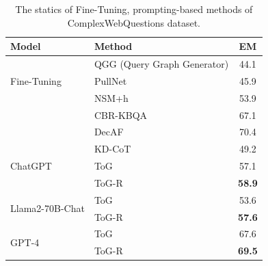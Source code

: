 \documentclass{article} %
\begin{document}
\begin{table}[]
\centering
\begin{tabular}{llc}
\hline
       \textbf{Model}    & \textbf{Method} &  \textbf{EM} \\ \hline
\multirow{3}{*}{Fine-Tuning}     
 &  QGG (Query Graph Generator) \citep{lan2020query}                    &  44.1 	   \\
 &   PullNet \citep{sun2019pullnet}                    & 45.9  \\
 &  NSM+h	 \citep{NSM}                       & 53.9	 \\
                              &  CBR-KBQA \citep{cwq1}	& 67.1	\\     
                                 &  	DecAF 	 
 \citep{webqsp1}                    & 70.4		 \\


                                
                                 \hline
\multirow{3}{*}{ChatGPT}          
                                 &  KD-CoT \citep{wang2023knowledgedriven}           &  49.2  \\
                                 &  ToG                 & 57.1  \\
                                  &  ToG-R                 & \textbf{58.9}   \\
                                  \hline

\multirow{2}{*}{Llama2-70B-Chat} 

 &  ToG                   & 53.6   \\
&  ToG-R                   &  \textbf{57.6}  \\
                                 \hline
\multirow{2}{*}{GPT-4}          
                                
                                 &  ToG                 & 67.6   \\  &  ToG-R                     &  \textbf{69.5}  \\ \hline
\end{tabular}

\caption{The statics of Fine-Tuning, prompting-based methods of ComplexWebQuestions dataset.}
\label{tab: cwq}
\end{table}
\end{document}
